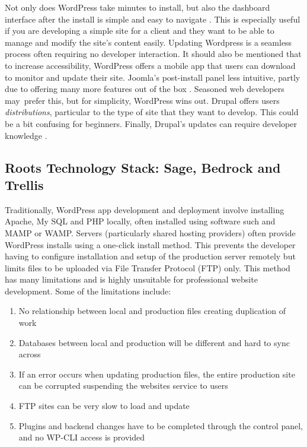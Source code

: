 \documentclass[fontsize=11pt]{extarticle}
\numberwithin{figure}{section} %
\numberwithin{table}{section}%
\providecommand{\tightlist}{%
  \setlength{\itemsep}{0pt}\setlength{\parskip}{0pt}}
\begin{document}
Not only does WordPress take minutes to install, but also the dashboard
interface after the install is simple and easy to navigate \cite{p3}.
This is especially useful if you are developing a simple site for a
client and they want to be able to manage and modify the site's content
easily. Updating Wordpress is a seamless process often requiring no
developer interaction. It should also be mentioned that to increase
accessibility, WordPress offers a mobile app that users can download to
monitor and update their site. Joomla's post-install panel less
intuitive, partly due to offering many more features out of the box
\cite{p2}. Seasoned web developers may~prefer this, but for simplicity,
WordPress wins out. Drupal offers users \emph{distributions}, particular
to the type of site that they want to develop. This could be a bit
confusing for beginners. Finally, Drupal's updates can require developer
knowledge \cite{p4}.

\hypertarget{roots-technology-stack-sage-bedrock-and-trellis}{%
\subsection{Roots Technology Stack: Sage, Bedrock and
Trellis}\label{roots-technology-stack-sage-bedrock-and-trellis}}

Traditionally, WordPress app development and deployment involve
installing Apache, My SQL and PHP locally, often installed using
software such and MAMP or WAMP. Servers (particularly shared hosting
providers) often provide WordPress installs using a one-click install
method. This prevents the developer having to configure installation and
setup of the production server remotely but limits files to be uploaded
via File Transfer Protocol (FTP) only. This method has many limitations
and is highly unsuitable for professional website development. Some of
the limitations include:

\begin{enumerate}

\tightlist
\item
  No relationship between local and production files creating
  duplication of work
\item
  Databases between local and production will be different and hard to
  sync across
\item
  If an error occurs when updating production files, the entire
  production site can be corrupted suspending the websites service to
  users
\item
  FTP sites can be very slow to load and update
\item
  Plugins and backend changes have to be completed through the control
  panel, and no WP-CLI access is provided \cite{p13}
\end{enumerate}
\end{document}
